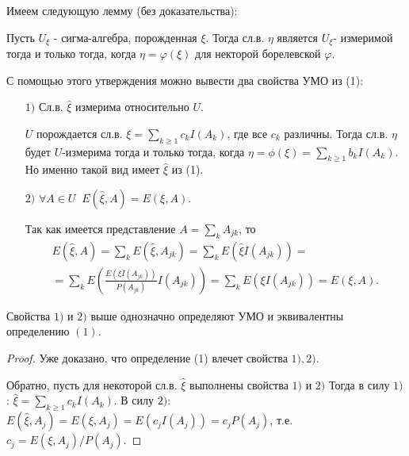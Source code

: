 Имеем следующую лемму (без доказательства):
\begin{lemma}
	Пусть $U_{\xi}$ - сигма-алгебра, порожденная $\xi$. Тогда сл.в. $\eta$ является $U_{\xi}$- измеримой тогда и только тогда, когда $\eta = \varphi(\xi)$ для некторой борелевской $\varphi$. 
\end{lemma}

С помощью этого утверждения можно вывести два свойства УМО из (1):
\begin{itemize}
	\item[$1)$] 
		Сл.в. $\hat{\xi}$ измерима относительно $U$.
		\begin{Proof}
			$ U$ порождается сл.в. $\displaystyle \xi = \sum\limits_{k\geq1}^{}c_kI(A_k)$, где все $c_k$ различны. Тогда сл.в. $\eta$ будет $U$-измерима тогда и только тогда, когда $\displaystyle \eta = \phi(\xi) = \sum\limits_{k\geq1}^{}b_kI(A_k)$.
			Но именно такой вид имеет $\hat{\xi}$ из (1).
		\end{Proof}
	\item[$2)$] 
		$ \forall A\in U \;\; E(\hat{\xi}, A) = E(\xi, A).$
		\begin{Proof}
			Так как имеется представление $\displaystyle A = \sum\limits_{k}^{}A_{jk}$, то 
			$$\begin{gathered}
				E(\hat{\xi}, A) = \sum\limits_{k}^{}E(\hat{\xi}, A_{jk}) = \sum\limits_{k}^{}E(\hat{\xi}I(A_{jk}))=\\
				=\sum\limits_{k}^{}E(\frac{E(\xi I(A_{jk}))}{P(A_{jk})}I(A_{jk})) = \sum\limits_{k}^{}E(\xi I(A_{jk})) = E(\xi, A).
			\end{gathered}$$
		\end{Proof}
\end{itemize}

\begin{lemma}
	Свойства $1)$ и $2)$ выше однозначно определяют УМО и эквивалентны определению $(1)$.
\end{lemma}
\begin{proof}
	Уже доказано, что определение (1) влечет свойства $1),2)$.

	Обратно, пусть для некоторой сл.в. $\hat{\xi}$ выполнены свойства $1)$ и $2)$ Тогда в силу $1)$: $\displaystyle \hat{\xi} = \sum\limits_{k\geq1}^{}c_kI(A_k)$. В силу $2)$: $\displaystyle E(\hat{\xi}, A_j) = E(\xi, A_{j}) = E(c_jI(A_j)) = c_jP(A_j)$, т.е. $c_j = E(\xi, A_j)/P(A_j)$.
\end{proof}

